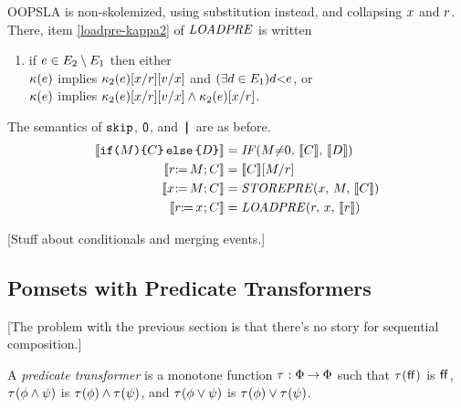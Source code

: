 OOPSLA is non-skolemized, using substitution instead, and collapsing $\aLoc$
and $\aReg$.
There, item \ref{loadpre-kappa2}  of $\sLOADPRE{}{}{}$ is written 
\begin{enumerate}
\item[] %
  if $\aEv\in\aEvs_2\setminus\aEvs_1$ then either \\
  $\labelingForm\SB0(\aEv)$ implies $\labelingForm_2(\aEv)[\aLoc/\aReg][\aVal/\aLoc]$ and $(\exists\bEv\in\aEvs_1)\bEv{<}\SB0\aEv$, or \\
  $\labelingForm\SB0(\aEv)$ implies
  $\labelingForm_2(\aEv)[\aLoc/\aReg][\aVal/\aLoc] \land \labelingForm_2(\aEv)[\aLoc/\aReg]$.
\end{enumerate}


The semantics of $\SKIP$, $\NIL$, and $\PAR$ are as before.
\begin{align*}
  \sem{\IF{\aExp}\THEN\aCmd\ELSE\bCmd\FI} &= \sIF{\aExp{\neq}0}\sTHEN\sem{\aCmd}\sELSE\sem{\bCmd}\sFI
  \\
  \sem{\LET{\aReg}{\aExp}\SEMI \aCmd} &= \sem{\aCmd}[\aExp/\aReg]
  \\
  \sem{\PW{\aLoc}{\aExp}\SEMI \aCmd} &= \sSTOREPRE{\aLoc}{\aExp}{\sem{\aCmd}}
  \\
  \sem{\PR{\aLoc}{\aReg}\SEMI \aCmd} &= \sLOADPRE{\aReg}{\aLoc}{\sem{\aReg}}
\end{align*}

[Stuff about conditionals and merging events.]


\subsection{Pomsets with Predicate Transformers}

\begin{figure*}
  
  \caption{Weakest Precondition and Strongest Postcondition \cite{}}
\end{figure*}

[The problem with the previous section is that there's no story for
sequential composition.]

\begin{definition}
  A \emph{predicate transformer} is a monotone function
  $\aTr:\Formulae\fun\Formulae$ such that
  $\aTr(\FALSE)$ is $\FALSE$,
  $\aTr(\aForm\land\bForm)$ is $\aTr(\aForm)\land\aTr(\bForm)$, and
  $\aTr(\aForm\lor\bForm)$ is $\aTr(\aForm)\lor\aTr(\bForm)$.
\end{definition}

